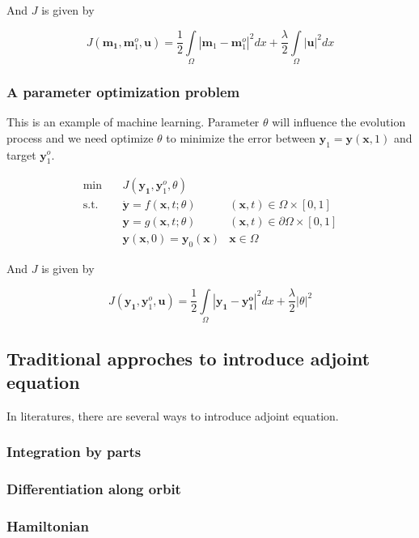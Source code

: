 \documentclass{article}
\begin{document}
And $ J $ is given by

$$
J(\mathbf{m_1}, \mathbf{m}_1^o, \mathbf{u}) = \frac{1}{2} \int\limits_{\Omega}|\mathbf{m}_1 - \mathbf{m}_1^o|^2 dx + \frac{\lambda}{2} \int\limits_{\Omega}|\mathbf{u}|^2 dx
$$

\subsubsection{A parameter optimization problem}

This is an example of machine learning. Parameter $\theta$ will influence the evolution process and we need optimize $\theta$ to minimize the error between $ \mathbf{y}_1 = \mathbf{y}(\mathbf{x}, 1)$ and target $ \mathbf{y}_1^o $.

$$
\begin{array}{rcll}
\min &~& J(\mathbf{y_1}, \mathbf{y}_1^o, \theta) & \\
\mathrm{s.t.} &~& \dot{\mathbf{y}} = f(\mathbf{x}, t; \theta) & (\mathbf{x}, t) \in \Omega \times [0, 1] \\
&~& \mathbf{y} = g(\mathbf{x}, t; \theta) & (\mathbf{x}, t) \in \partial \Omega \times [0, 1] \\
&~& \mathbf{y}(\mathbf{x}, 0) = \mathbf{y}_0(\mathbf{x}) & \mathbf{x} \in \Omega
\end{array}
$$

And $ J $ is given by

$$
J(\mathbf{y_1}, \mathbf{y}_1^o, \mathbf{u}) = \frac{1}{2} \int\limits_{\Omega}|\mathbf{y_1} - \mathbf{y_1^o}|^2dx + \frac{\lambda}{2} |\theta|^2
$$

\subsection{Traditional approches to introduce adjoint equation}

In literatures, there are several ways to introduce adjoint equation.

\subsubsection{Integration by parts}

\subsubsection{Differentiation along orbit}

\subsubsection{Hamiltonian}
\end{document}

